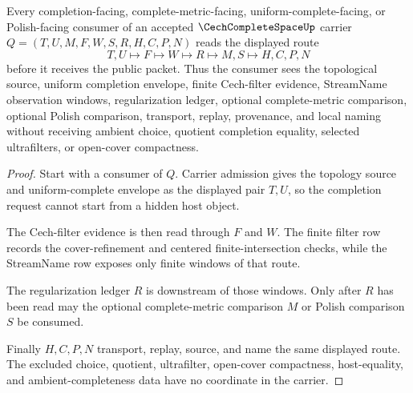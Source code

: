 \begin{theorem}\label{thm:cech-complete-space-completion-handoff}
Every completion-facing, complete-metric-facing, uniform-complete-facing, or Polish-facing consumer of an accepted $\CechCompleteSpaceUp$ carrier $Q=(T,U,M,F,W,S,R,H,C,P,N)$ reads the displayed route
$$
T,U \longmapsto F \longmapsto W \longmapsto R \longmapsto M,S \longmapsto H,C,P,N
$$
before it receives the public packet. Thus the consumer sees the topological source, uniform completion envelope, finite Cech-filter evidence, StreamName observation windows, regularization ledger, optional complete-metric comparison, optional Polish comparison, transport, replay, provenance, and local naming without receiving ambient choice, quotient completion equality, selected ultrafilters, or open-cover compactness.
\end{theorem}
\begin{proof}
Start with a consumer of $Q$. Carrier admission gives the topology source and uniform-complete envelope as the displayed pair $T,U$, so the completion request cannot start from a hidden host object.

The Cech-filter evidence is then read through $F$ and $W$. The finite filter row records the cover-refinement and centered finite-intersection checks, while the StreamName row exposes only finite windows of that route.

The regularization ledger $R$ is downstream of those windows. Only after $R$ has been read may the optional complete-metric comparison $M$ or Polish comparison $S$ be consumed.

Finally $H,C,P,N$ transport, replay, source, and name the same displayed route. The excluded choice, quotient, ultrafilter, open-cover compactness, host-equality, and ambient-completeness data have no coordinate in the carrier.
\end{proof}



